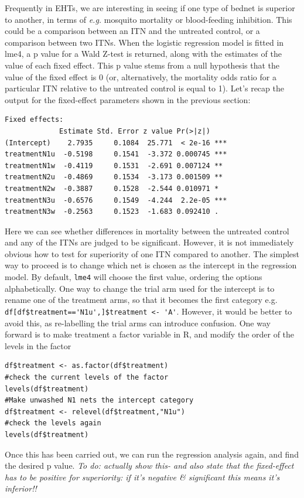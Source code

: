 \documentclass[11pt]{article}
\begin{document}
Frequently in EHTs, we are interesting in seeing if one type of bednet is superior to another, in terms of \textit{e.g.} mosquito mortality or blood-feeding inhibition. This could be a comparison between an ITN and the untreated control, or a comparison between two ITNs. When the logistic regression model is fitted in lme4, a p value for a Wald Z-test is returned, along with the estimates of the value of each fixed effect. This p value stems from a null hypothesis that the value of the fixed effect is 0 (or, alternatively, the mortality odds ratio for a particular ITN relative to the untreated control is equal to 1). Let's recap the output for the fixed-effect parameters shown in the previous section:
\begin{verbatim}
Fixed effects:
             Estimate Std. Error z value Pr(>|z|)    
(Intercept)    2.7935     0.1084  25.771  < 2e-16 ***
treatmentN1u  -0.5198     0.1541  -3.372 0.000745 ***
treatmentN1w  -0.4119     0.1531  -2.691 0.007124 ** 
treatmentN2u  -0.4869     0.1534  -3.173 0.001509 ** 
treatmentN2w  -0.3887     0.1528  -2.544 0.010971 *  
treatmentN3u  -0.6576     0.1549  -4.244  2.2e-05 ***
treatmentN3w  -0.2563     0.1523  -1.683 0.092410 .  
\end{verbatim}
Here we can see whether differences in mortality between the untreated control and any of the ITNs are judged to be significant. However, it is not immediately obvious how to test for superiority of one ITN compared to another. The simplest way to proceed is to change which net is chosen as the intercept in the regression model. By default, \verb+lme4+ will choose the first value, ordering the options alphabetically. One way to change the trial arm used for the intercept is to rename one of the treatment arms, so that it becomes the first category e.g. \verb+df[df$treatment=='N1u',]$treatment <- 'A'+. However, it would be better to avoid this, as re-labelling the trial arms can introduce confusion. One way forward is to make treatment a factor variable in R, and modify the order of the levels in the factor 
\begin{verbatim}
df$treatment <- as.factor(df$treatment)
#check the current levels of the factor
levels(df$treatment)
#Make unwashed N1 nets the intercept category
df$treatment <- relevel(df$treatment,"N1u") 
#check the levels again
levels(df$treatment)
\end{verbatim}
Once this has been carried out, we can run the regression analysis again, and find the desired p value. \textit{To do: actually show this- and also state that the fixed-effect has to be positive for superiority: if it's negative \& significant this means it's inferior!!}
\end{document}
